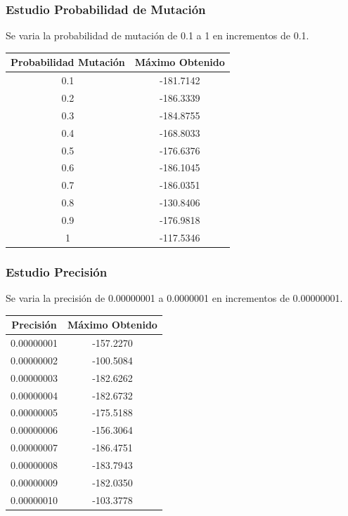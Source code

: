 \documentclass[12pt]{article}
\begin{document}
\subsubsection*{Estudio Probabilidad de Mutación}
	Se varia la probabilidad de mutación de 0.1 a 1 en incrementos de 0.1.
\begin{table}[H]
\begin{center}
\begin{tabular}{|cc|} \hline
Probabilidad Mutación & Máximo Obtenido \\  \hline
0.1 & -181.7142 \\ 
0.2 & -186.3339 \\ 
0.3 & -184.8755 \\
0.4 & -168.8033 \\
0.5 & -176.6376 \\
0.6 & -186.1045 \\
0.7 & -186.0351 \\
0.8 & -130.8406 \\ 
0.9 & -176.9818 \\
1   & -117.5346 \\  \hline
\end{tabular}
\end{center}
\end{table}
\subsubsection*{Estudio Precisión}
	Se varia la precisión de 0.00000001 a 0.0000001 en incrementos de 0.00000001.
\begin{table}[H]
\begin{center}
\begin{tabular}{|cc|} \hline
Precisión & Máximo Obtenido \\  \hline
0.00000001 & -157.2270 \\ 
0.00000002 & -100.5084 \\ 
0.00000003 & -182.6262 \\
0.00000004 & -182.6732 \\
0.00000005 & -175.5188 \\
0.00000006 & -156.3064 \\
0.00000007 & -186.4751 \\
0.00000008 & -183.7943 \\ 
0.00000009 & -182.0350 \\
0.00000010 & -103.3778 \\  \hline
\end{tabular}
\end{center}
\end{table}


	
\end{document}
